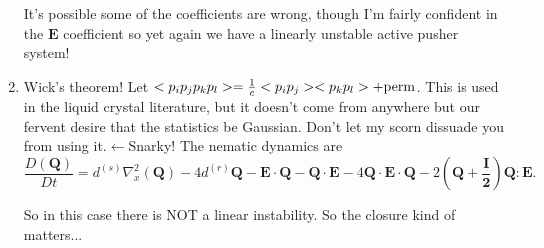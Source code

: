 \documentclass[onecolumn,showpacs,preprintnumbers,prl,amsmath,amssymb]{revtex4-1}
\def\b{\mathbf}
\begin{document}
\begin{enumerate}
It's possible some of the coefficients are wrong, though I'm fairly confident in the $\b{E}$ coefficient so yet again we have a linearly unstable active pusher system!

\item Wick's theorem! Let $<p_ip_jp_kp_l>=\frac{1}{c}<p_ip_j><p_kp_l>+{\rm perm}$. This is used in the liquid crystal literature, but it doesn't come from anywhere but our fervent desire that the statistics be Gaussian. Don't let my scorn dissuade you from using it.$\leftarrow$Snarky!
The nematic dynamics are
\begin{equation}
\frac{D(\b{Q})}{Dt}=d^{(s)}\nabla_x^2(\b{Q})-4d^{(r)}\b{Q}-\b{E\cdot Q}-\b{Q\cdot E}-4\b{Q\cdot E \cdot Q}-2(\b{Q+\frac{I}{2}})\b{ Q:E}.
\end{equation}

So in this case there is NOT a linear instability.  So the closure kind of matters...
\end{enumerate}
\end{document}
